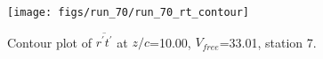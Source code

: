 \begin{figure}[H]
\centering
\texttt{[image: figs/run\_70/run\_70\_rt\_contour]}
\caption{Contour plot of $\overline{r^\prime t^\prime}$ at $z/c$=10.00, $V_{free}$=33.01, station 7.}
\label{fig:run_70_rt_contour}
\end{figure}


